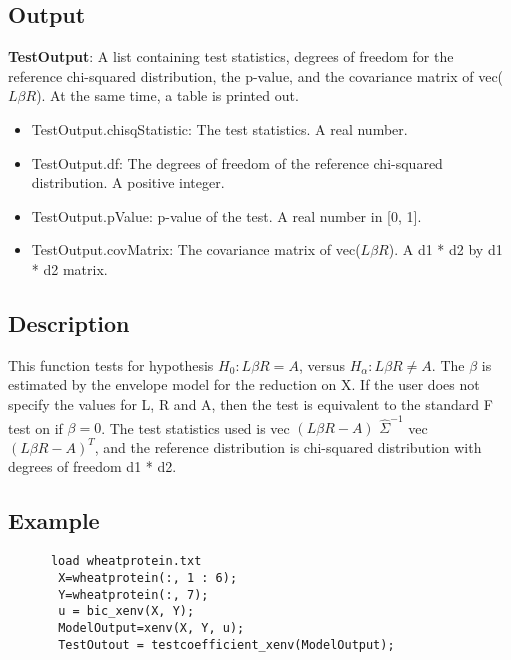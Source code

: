 \documentclass[a4paper,11pt,openany]{memoir}
\begin{document}
\subsection*{Output}

\begin{par}
\textbf{TestOutput}: A list containing test statistics, degrees of freedom for the reference chi-squared distribution, the p-value, and the covariance matrix of vec($L\beta R$).  At the same time, a table is printed out.
\end{par} \vspace{1em}
\begin{itemize}
\setlength{\itemsep}{-1ex}
   \item TestOutput.chisqStatistic: The test statistics. A real number.
   \item TestOutput.df: The degrees of freedom of the reference chi-squared distribution.  A positive integer.
   \item TestOutput.pValue: p-value of the test.  A real number in [0, 1].
   \item TestOutput.covMatrix: The covariance matrix of vec($L\beta R$). A d1 * d2 by d1 * d2 matrix.
\end{itemize}


\subsection*{Description}

\begin{par}
This function tests for hypothesis $H_0: L\beta R = A$, versus $H_\alpha: L\beta R\neq A$.  The $\beta$ is estimated by the envelope model for the reduction on X.  If the user does not specify the values for L, R and A, then the test is equivalent to the standard F test on if $\beta = 0$.  The test statistics used is vec $(L\beta R - A)$ $\hat{\Sigma}^{-1}$ vec $(L\beta R - A)^{T}$, and the reference distribution is chi-squared distribution with degrees of freedom d1 * d2.
\end{par} \vspace{1em}


\subsection*{Example}


\begin{verbatim}      load wheatprotein.txt
       X=wheatprotein(:, 1 : 6);
       Y=wheatprotein(:, 7);
       u = bic_xenv(X, Y);
       ModelOutput=xenv(X, Y, u);
       TestOutout = testcoefficient_xenv(ModelOutput);\end{verbatim}
    
\end{document}
